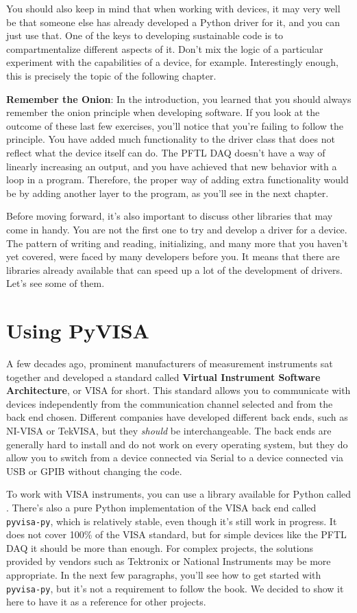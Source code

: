 You should also keep in mind that when working with devices, it may very well be that someone else has already developed a Python driver for it, and you can just use that. One of the keys to developing sustainable code is to compartmentalize different aspects of it. Don't mix the logic of a particular experiment with the capabilities of a device, for example. Interestingly enough, this is precisely the topic of the following chapter.

\textbf{Remember the Onion}: In the introduction, you learned that you should always remember the onion principle when developing software. If you look at the outcome of these last few exercises, you'll notice that you're failing to follow the principle. You have added much functionality to the driver class that does not reflect what the device itself can do. The {PFTL DAQ} doesn't have a way of linearly increasing an output, and you have achieved that new behavior with a loop in a program. Therefore, the proper way of adding extra functionality would be by adding another layer to the program, as you'll see in the next chapter.

Before moving forward, it's also important to discuss other libraries that may come in handy. You are not the first one to try and develop a driver for a device. The pattern of writing and reading, initializing, and many more that you haven't yet covered, were faced by many developers before you. It means that there are libraries already available that can speed up a lot of the development of drivers. Let's see some of them.

\section{Using PyVISA}\label{sec:pyvisa}
A few decades ago, prominent manufacturers of measurement instruments sat together and developed a standard called \textbf{Virtual Instrument Software Architecture}, or VISA for short. This standard allows you to communicate with devices independently from the communication channel selected and from the back end chosen. Different companies have developed different back ends, such as NI-VISA or TekVISA, but they \emph{should} be interchangeable. The back ends are generally hard to install and do not work on every operating system, but they do allow you to switch from a device connected via Serial to a device connected via USB or GPIB without changing the code.

To work with VISA instruments, you can use a library available for Python called . There's also a pure Python implementation of the VISA back end called \texttt{pyvisa-py}, which is relatively stable, even though it's still work in progress. It does not cover 100\% of the VISA standard, but for simple devices like the {PFTL DAQ} it should be more than enough. For complex projects, the solutions provided by vendors such as Tektronix or National Instruments may be more appropriate. In the next few paragraphs, you'll see how to get started with \texttt{pyvisa-py}, but it's not a requirement to follow the book. We decided to show it here to have it as a reference for other projects.

